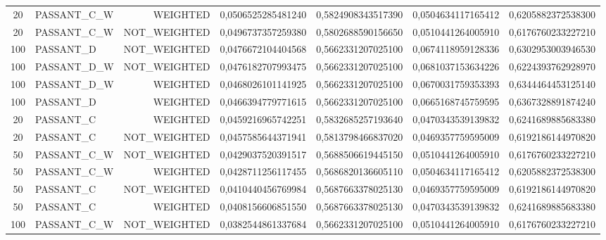 \begin{table}[H]
{\begin{tabular}{ c l r c c c c }
				20 & PASSANT\_C\_W &   WEIGHTED & 0,0506525285481240 & 0,5824908343517390 & 0,0504634117165412 & 0,6205882372538300 \\
				
				20 & PASSANT\_C\_W & NOT\_WEIGHTED & 0,0496737357259380 & 0,5802688590156650 & 0,0510441264005910 & 0,6176760233227210 \\
				
				100 &  PASSANT\_D & NOT\_WEIGHTED & 0,0476672104404568 & 0,5662331207025100 & 0,0674118959128336 & 0,6302953003946530 \\
				
				100 & PASSANT\_D\_W & NOT\_WEIGHTED & 0,0476182707993475 & 0,5662331207025100 & 0,0681037153634226 & 0,6224393762928970 \\
				
				100 & PASSANT\_D\_W &   WEIGHTED & 0,0468026101141925 & 0,5662331207025100 & 0,0670031759353393 & 0,6344464453125140 \\
				
				100 &  PASSANT\_D &   WEIGHTED & 0,0466394779771615 & 0,5662331207025100 & 0,0665168745759595 & 0,6367328891874240 \\
				
				20 &  PASSANT\_C &   WEIGHTED & 0,0459216965742251 & 0,5832685257193640 & 0,0470343539139832 & 0,6241689885683380 \\
				
				20 &  PASSANT\_C & NOT\_WEIGHTED & 0,0457585644371941 & 0,5813798466837020 & 0,0469357759595009 & 0,6192186144970820 \\
				
				50 & PASSANT\_C\_W & NOT\_WEIGHTED & 0,0429037520391517 & 0,5688506619445150 & 0,0510441264005910 & 0,6176760233227210 \\
				
				50 & PASSANT\_C\_W &   WEIGHTED & 0,0428711256117455 & 0,5686820136605110 & 0,0504634117165412 & 0,6205882372538300 \\
				
				50 &  PASSANT\_C & NOT\_WEIGHTED & 0,0410440456769984 & 0,5687663378025130 & 0,0469357759595009 & 0,6192186144970820 \\
				
				50 &  PASSANT\_C &   WEIGHTED & 0,0408156606851550 & 0,5687663378025130 & 0,0470343539139832 & 0,6241689885683380 \\
				
				100 & PASSANT\_C\_W & NOT\_WEIGHTED & 0,0382544861337684 & 0,5662331207025100 & 0,0510441264005910 & 0,6176760233227210 \\
				

\end{tabular}}
\end{table}
